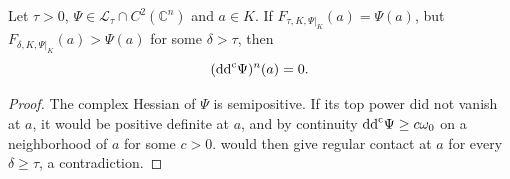 \begin{corollary}\label{cor:affine-weight-degenerate-hessian}
Let $\tau>0$, $\Psi\in\mathcal L_\tau\cap C^2(\mathbb C^n)$ and $a\in K$. If $F_{\tau,K,\Psi|_K}(a)=\Psi(a)$, but $F_{\delta,K,\Psi|_K}(a)>\Psi(a)$ for some $\delta>\tau$, then
\[
 (\mathrm{dd}^{\mathrm{c}}\Psi)^n(a)=0.
\]
\end{corollary}
\begin{proof}
The complex Hessian of $\Psi$ is semipositive. If its top power did not vanish at $a$, it would be positive definite at $a$, and by continuity $\mathrm{dd}^{\mathrm{c}}\Psi\geq c\omega_0$ on a neighborhood of $a$ for some $c>0$.  would then give regular contact at $a$ for every $\delta\geq\tau$, a contradiction.
\end{proof}
